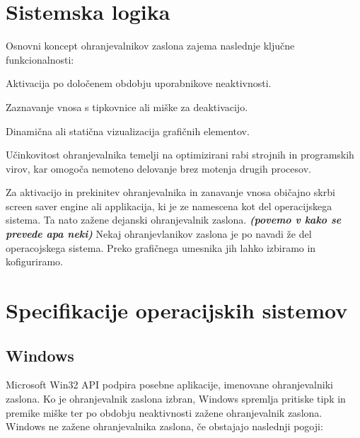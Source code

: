 \documentclass[11pt, oneside]{article}   	%
\newcommand\kw[1]{\textbf{\itshape #1}}
\begin{document}
\section{Sistemska logika}

Osnovni koncept ohranjevalnikov zaslona zajema naslednje ključne funkcionalnosti:
\begin{description}[font=$\bullet$~\normalfont\scshape\color{red!50!black}]
\item Aktivacija po določenem obdobju uporabnikove neaktivnosti.
\item Zaznavanje vnosa s tipkovnice ali miške za deaktivacijo.
\item Dinamična ali statična vizualizacija grafičnih elementov.
\end{description}

Učinkovitost ohranjevalnika temelji na optimizirani rabi strojnih in programskih virov, kar omogoča nemoteno delovanje brez motenja drugih procesov.

Za aktivacijo in prekinitev ohranjevalnika in zanavanje vnosa običajno skrbi screen saver engine ali applikacija, ki je ze namescena kot del operacijskega sistema.
Ta nato zažene dejanski ohranjevalnik zaslona. \kw{(povemo v kako se prevede apa neki)} Nekaj ohranjevlanikov zaslona je po navadi že del operacojskega sistema. Preko grafičnega umesnika jih lahko izbiramo in kofiguriramo.

\section{Specifikacije operacijskih sistemov}

\subsection{Windows}
Microsoft Win32 API podpira posebne aplikacije, imenovane ohranjevalniki zaslona. Ko je ohranjevalnik zaslona izbran, Windows spremlja pritiske tipk in premike miške ter po obdobju neaktivnosti zažene ohranjevalnik zaslona. Windows ne zažene ohranjevalnika zaslona, če obstajajo naslednji pogoji:
\end{document}
